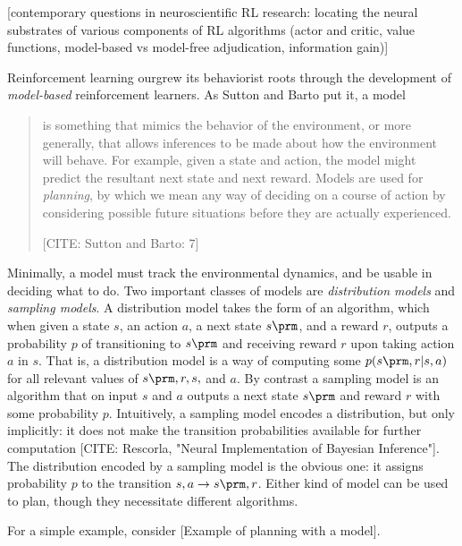 [contemporary questions in neuroscientific RL research: locating the neural substrates of various components of RL algorithms (actor and critic, value functions, model-based vs model-free adjudication, information gain)]

Reinforcement learning ourgrew its behaviorist roots through the development of \emph{model-based} reinforcement learners.
As Sutton and Barto put it, a model
\begin{quote}
	is something that mimics the behavior of the environment, or more generally, that allows inferences to be made about how the environment will behave.
	For example, given a state and action, the model might predict the resultant next state and next reward.
	Models are used for \emph{planning}, by which we mean any way of deciding on a course of action by considering possible future situations before they are actually experienced.
	
	\hfill [CITE: Sutton and Barto: 7]
\end{quote}
Minimally, a model must track the environmental dynamics, and be usable in deciding what to do.
Two important classes of models are \emph{distribution models} and \emph{sampling models}.
A distribution model takes the form of an algorithm, which when given a state $s$, an action $a$, a next state $s\prm$, and a reward $r$, outputs a probability $p$ of transitioning to $s\prm$ and receiving reward $r$ upon taking action $a$ in $s$.
That is, a distribution model is a way of computing some $p(s\prm, r | s, a)$ for all relevant values of $s\prm, r, s,$ and $a$.
By contrast a sampling model is an algorithm that on input $s$ and $a$ outputs a next state $s\prm$ and reward $r$ with some probability $p$.
Intuitively, a sampling model encodes a distribution, but only implicitly: it does not make the transition probabilities available for further computation [CITE: Rescorla, "Neural Implementation of Bayesian Inference"].
The distribution encoded by a sampling model is the obvious one: it assigns probability $p$ to the transition $s, a \to s\prm, r$.
Either kind of model can be used to plan, though they necessitate different algorithms.

For a simple example, consider [Example of planning with a model].



